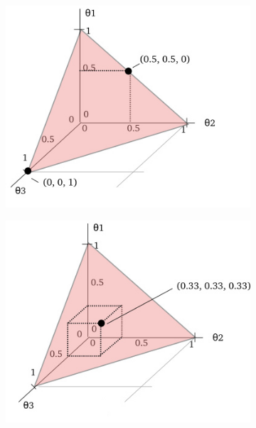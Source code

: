 \begin{figure}
    \begin{subfigure}{.45\textwidth}
        \centering
        \includegraphics[width=\linewidth]{assets/4/simplex_3.png}
        \caption{}
        \label{fig:4_simplex_3}
    \end{subfigure}%
    \begin{subfigure}{.45\textwidth}
        \centering
        \includegraphics[width=\linewidth]{assets/4/simplex_4.png}
        \caption{}
        \label{fig:4_simplex_4}
    \end{subfigure}


\end{figure}
